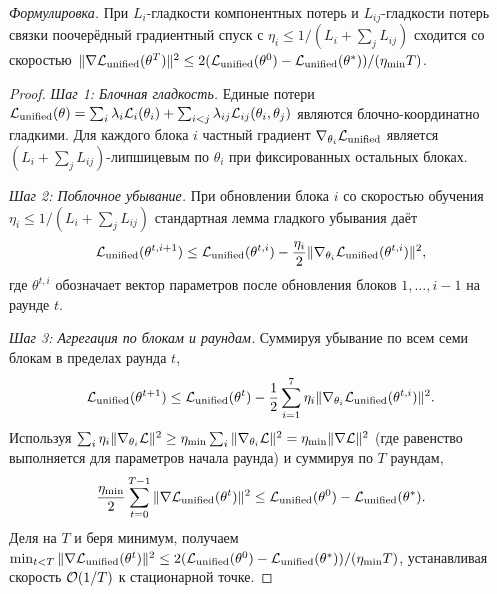 \noindent\textit{Формулировка.} При $L_i$-гладкости компонентных потерь и $L_{ij}$-гладкости потерь связки поочерёдный градиентный спуск с $\eta_i\le 1/(L_i+\sum_j L_{ij})$ сходится со скоростью $\|\nabla\mathcal{L}_{\mathrm{unified}}(\theta^T)\|^2\le 2(\mathcal{L}_{\mathrm{unified}}(\theta^0)-\mathcal{L}_{\mathrm{unified}}(\theta^*))/(\eta_{\min}T)$.

\begin{proof}
\textit{Шаг 1: Блочная гладкость.} Единые потери $\mathcal{L}_{\mathrm{unified}}(\theta) = \sum_i\lambda_i\mathcal{L}_i(\theta_i) + \sum_{i<j}\lambda_{ij}\mathcal{L}_{ij}(\theta_i,\theta_j)$ являются блочно-координатно гладкими. Для каждого блока $i$ частный градиент $\nabla_{\theta_i}\mathcal{L}_{\mathrm{unified}}$ является $(L_i+\sum_j L_{ij})$-липшицевым по $\theta_i$ при фиксированных остальных блоках.

\textit{Шаг 2: Поблочное убывание.} При обновлении блока $i$ со скоростью обучения $\eta_i\le 1/(L_i+\sum_j L_{ij})$ стандартная лемма гладкого убывания даёт
\begin{equation}
\mathcal{L}_{\mathrm{unified}}(\theta^{t,i+1}) \le \mathcal{L}_{\mathrm{unified}}(\theta^{t,i}) - \frac{\eta_i}{2}\|\nabla_{\theta_i}\mathcal{L}_{\mathrm{unified}}(\theta^{t,i})\|^2,
\end{equation}
где $\theta^{t,i}$ обозначает вектор параметров после обновления блоков $1,\ldots,i{-}1$ на раунде $t$.

\textit{Шаг 3: Агрегация по блокам и раундам.} Суммируя убывание по всем семи блокам в пределах раунда $t$,
\begin{equation}
\mathcal{L}_{\mathrm{unified}}(\theta^{t+1}) \le \mathcal{L}_{\mathrm{unified}}(\theta^{t}) - \frac{1}{2}\sum_{i=1}^7\eta_i\|\nabla_{\theta_i}\mathcal{L}_{\mathrm{unified}}(\theta^{t,i})\|^2.
\end{equation}
Используя $\sum_i\eta_i\|\nabla_{\theta_i}\mathcal{L}\|^2\ge\eta_{\min}\sum_i\|\nabla_{\theta_i}\mathcal{L}\|^2 = \eta_{\min}\|\nabla\mathcal{L}\|^2$ (где равенство выполняется для параметров начала раунда) и суммируя по $T$ раундам,
\begin{equation}
\frac{\eta_{\min}}{2}\sum_{t=0}^{T-1}\|\nabla\mathcal{L}_{\mathrm{unified}}(\theta^t)\|^2
\le \mathcal{L}_{\mathrm{unified}}(\theta^0) - \mathcal{L}_{\mathrm{unified}}(\theta^*).
\end{equation}
Деля на $T$ и беря минимум, получаем $\min_{t<T}\|\nabla\mathcal{L}_{\mathrm{unified}}(\theta^t)\|^2\le 2(\mathcal{L}_{\mathrm{unified}}(\theta^0)-\mathcal{L}_{\mathrm{unified}}(\theta^*))/(\eta_{\min}T)$, устанавливая скорость $\mathcal{O}(1/T)$ к стационарной точке.
\end{proof}


